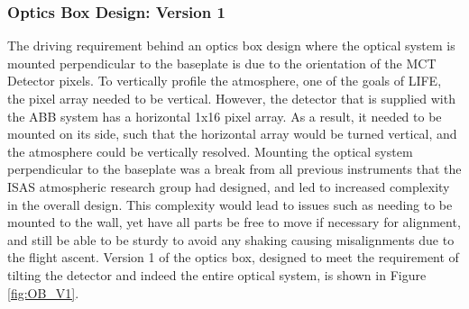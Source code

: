 \subsubsection{Optics Box Design: Version 1}
The driving requirement behind an optics box design where the optical system is mounted perpendicular to the baseplate is due to the orientation of the MCT Detector pixels. To vertically profile the atmosphere, one of the goals of LIFE, the pixel array needed to be vertical. However, the detector that is supplied with the ABB system has a horizontal 1x16 pixel array. As a result, it needed to be mounted on its side, such that the horizontal array would be turned vertical, and the atmosphere could be vertically resolved. Mounting the optical system perpendicular to the baseplate was a break from all previous instruments that the ISAS atmospheric research group had designed, and led to increased complexity in the overall design. This complexity would lead to issues such as needing to be mounted to the wall, yet have all parts be free to move if necessary for alignment, and still be able to be sturdy to avoid any shaking causing misalignments due to the flight ascent. Version 1 of the optics box, designed to meet the requirement of tilting the detector and indeed the entire optical system, is shown in Figure \ref{fig:OB_V1}.

